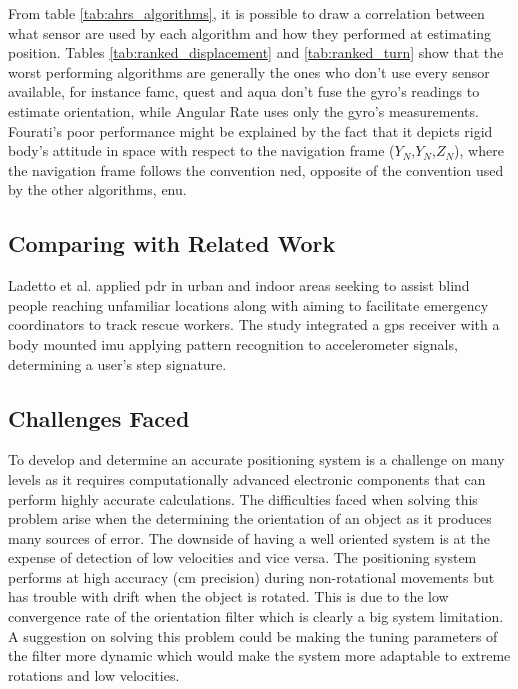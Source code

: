 From table \ref{tab:ahrs_algorithms}, it is possible to draw a correlation between what sensor are used by each algorithm and how they performed at estimating position. Tables \ref{tab:ranked_displacement} and \ref{tab:ranked_turn} show that the worst performing algorithms are generally the ones who don't use every sensor available, for instance \acrshort{famc}, \acrshort{quest} and \acrshort{aqua} don't fuse the gyro's readings to estimate orientation, while Angular Rate uses only the gyro's measurements. Fourati's poor performance might be explained by the fact that it depicts rigid body's attitude in space with respect to the navigation frame ($Y_N$,$Y_N$,$Z_N$), where the navigation frame follows the convention \acrfull{ned}, opposite of the convention used by the other algorithms, \acrfull{enu}.


\subsection{Comparing with Related Work}

Ladetto et al. \cite{ladetto2002step} applied \acrshort{pdr} in urban and indoor areas seeking to assist blind people reaching unfamiliar locations along with aiming to facilitate emergency coordinators to track rescue workers. The study integrated a \acrshort{gps} receiver with a body mounted \acrshort{imu} applying pattern recognition to accelerometer signals, determining a user's step signature.

\subsection{Challenges Faced}

To develop and determine an accurate positioning system is a challenge on many levels as it requires computationally advanced electronic components that can perform highly accurate calculations. The difficulties faced when solving this problem arise when the determining the orientation of an object as it produces many sources of error. The downside of having a well oriented system is at the expense of detection of low velocities and vice versa. The positioning system performs at high accuracy (cm precision) during non-rotational movements but has trouble with drift when the object is rotated. This is due to the low convergence rate of the orientation filter which is clearly a big system limitation. A suggestion on solving this problem could be making the tuning parameters of the filter more dynamic which would make the system more adaptable to extreme rotations and low velocities.

